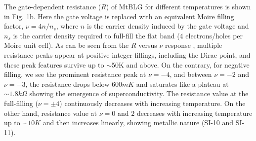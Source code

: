 \documentclass{nature}
\begin{document}
The gate-dependent resistance ($R$) of MtBLG for different temperatures is shown in Fig. 1b. Here the gate voltage is replaced with an equivalent Moire filling factor, $\nu=4n/n_s$, where $n$ is the carrier density induced by the gate voltage and $n_s$ is the carrier density required to full-fill the flat band (4 electrons/holes per Moire unit cell). As can be seen from the $R$ versus $\nu$ response%
, multiple resistance peaks appear at positive integer fillings, including the Dirac point, and these peak features survive up to $\sim$50K and above. On the contrary, for negative filling, we see the prominent resistance peak at $\nu=-4$, and between $\nu=-2$ and $\nu=-3$, %
the resistance drops %
below $600mK$ and saturates like a plateau %
at $\sim 1.8 k\Omega$ %
showing the emergence of superconductivity. %
The resistance value at the full-filling ($\nu=\pm 4$) continuously decreases with increasing temperature. %
On the other hand, resistance value at $\nu=0$ and $2$ decreases with increasing temperature up to $\sim 10 K$ and then increases linearly, showing metallic nature (SI-10 and SI-11). %
\end{document}
